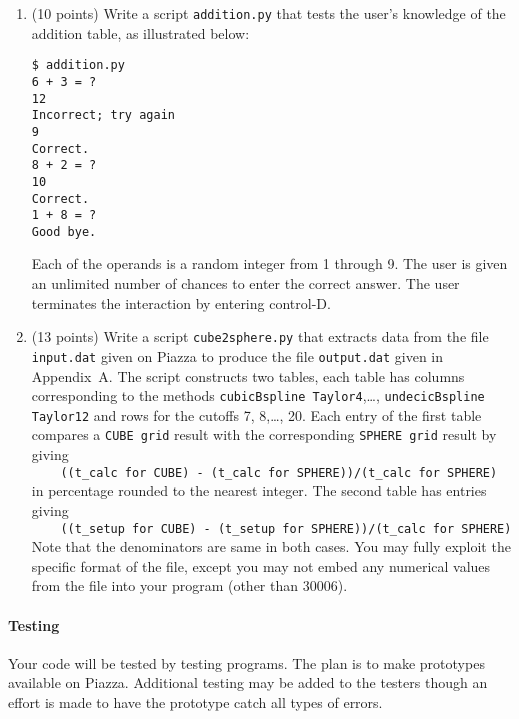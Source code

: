 \documentclass[11pt]{article}
\begin{document}
\begin{enumerate}
\item (10 points)  %
Write a script {\tt addition.py} that tests the user's knowledge
of the addition table, as illustrated below:
{\small\begin{verbatim}
$ addition.py
6 + 3 = ?
12
Incorrect; try again
9
Correct.
8 + 2 = ?
10
Correct.
1 + 8 = ?
Good bye.
\end{verbatim}}\noindent  %
Each of the operands is a random integer from 1 through 9.
The user is given an unlimited number of chances to enter the correct answer.
The user terminates the interaction by entering control-D.


\item (13 points)  %
 Write a script {\tt cube2sphere.py} that extracts data from the file
 {\tt input.dat} given on Piazza to produce the file {\tt output.dat}
 given in Appendix~A.
 The script constructs two tables,
 each table has columns corresponding to the methods
 {\tt cubicBspline Taylor4},\ldots, {\tt  undecicBspline Taylor12}
 and rows for the cutoffs 7, 8,\ldots, 20.
 Each entry of the first table compares a {\tt CUBE grid} result with the
 corresponding {\tt SPHERE grid} result by giving \\
 \verb|    ((t_calc for CUBE) - (t_calc for SPHERE))/(t_calc for SPHERE)| \\
 in percentage rounded to the nearest integer.
 The second table has entries giving \\
 \verb|    ((t_setup for CUBE) - (t_setup for SPHERE))/(t_calc for SPHERE)| \\
 Note that the denominators are same in both cases.
 You may fully exploit the specific format of the file,
 except you may not embed any numerical values from the file
 into your program (other than 30006).


\end{enumerate}



\paragraph{Testing}
Your code will be tested by testing programs.
The plan is to make prototypes available on Piazza.
Additional testing may be added to the testers though
an effort is made to have the prototype catch all types of errors.
\end{document}
